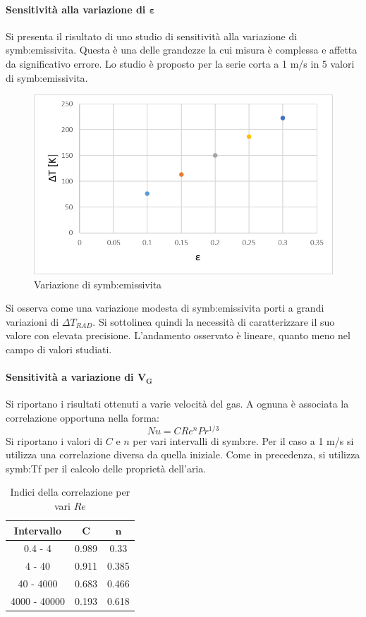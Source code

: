 \paragraph{Sensitività alla variazione di $\bm{\varepsilon}$}
Si presenta il risultato di uno studio di sensitività alla variazione di \gls{symb:emissivita}. Questa è una delle grandezze la cui misura è complessa e affetta da significativo errore. Lo studio è proposto per la serie corta a 1 m/s in 5 valori di \gls{symb:emissivita}.

\begin{figure} [H]
	\centering
	\includegraphics[width=0.7\linewidth]{"../sperimentazione nei propulsori/varepsilon"}
	\caption{Variazione di \gls{symb:emissivita}}
	\label{fig:variazioneepsilon}
\end{figure}

Si osserva come una variazione modesta di \gls{symb:emissivita} porti a grandi variazioni di $\Delta T_{\textit{RAD}}$. Si sottolinea quindi la necessità di caratterizzare il suo valore con elevata precisione. L'andamento osservato è lineare, quanto meno nel campo di valori studiati.

\paragraph{Sensitività a variazione di $\bm{V_G}$}
Si riportano i risultati ottenuti a varie velocità del gas. A ognuna è associata la correlazione opportuna nella forma:
\begin{equation}
	Nu = C Re^{n}Pr^{1/3} \label{eq:corrnew}
\end{equation}
Si riportano i valori di $C$ e $n$ per vari intervalli di \gls{symb:re}. Per il caso a 1 m/s si utilizza una correlazione diversa da quella iniziale. Come in precedenza, si utilizza \gls{symb:Tf} per il calcolo delle proprietà dell'aria.

\begin{table}[H]
	\centering
	\begin{tabular}{c|c|c}
		\toprule
		\toprule
		\textbf{Intervallo}&  $\bm{C}$ &  $\bm{n}$\\
		\midrule
		\midrule
		0.4 - 4 & 0.989 & 0.33\\
		\midrule
		4 - 40 & 0.911 &0.385\\
		\midrule
		40 - 4000 & 0.683 &0.466\\
		\midrule
		4000 - 40000 & 0.193 &0.618\\
		\bottomrule
		\bottomrule	
	\end{tabular}
	\caption{Indici della correlazione per vari $Re$}
	\label{tab:RErange}
\end{table}


